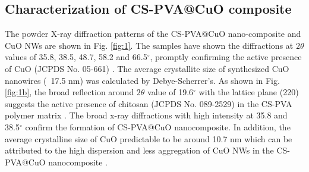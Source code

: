 \documentclass[final,5p,times,twocolumn,authoryear]{elsarticle}
\begin{document}
\subsection{Characterization of CS-PVA@CuO composite}
The powder X-ray diffraction patterns of the CS-PVA@CuO nano-composite and CuO NWs are shown in Fig. \ref{fig:1}. The samples have shown the diffractions at $2\theta$ values of 35.8, 38.5, 48.7, 58.2 and 66.5$^\circ$, promptly confirming the active presence of CuO (JCPDS No. 05-661) \cite{ref24}. The average crystallite size of synthesized CuO nanowires (~17.5 nm) was calculated by Debye-Scherrer's. As shown in Fig. \ref{fig:1b}, the broad reflection around $2\theta$ value of 19.6$^\circ$ with the lattice plane (220) suggests the active presence of chitosan (JCPDS No. 089-2529) in the CS-PVA polymer matrix \cite{ref25}. The broad x-ray diffractions with high intensity at 35.8 and 38.5$^\circ$ confirm the formation of CS-PVA@CuO nanocomposite. In addition, the average crystalline size of CuO predictable to be around 10.7 nm which can be attributed to the high dispersion and less aggregation of CuO NWs in the CS-PVA@CuO nanocomposite \cite{ref26}.
\end{document}

